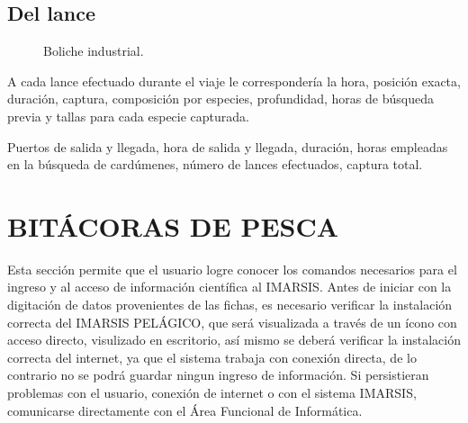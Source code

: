 \documentclass[a4paper,oneside,11pt]{book}
\begin{document}
\section{Del lance}
 \begin{figure}[!h]
  \begin{center} 
  \caption{Boliche industrial.}
 \end{center}
  \end{figure}

A cada lance efectuado durante el viaje le correspondería la hora, posición exacta, duración, captura, composición por especies, profundidad, horas de búsqueda previa y tallas para cada especie capturada.

Puertos de salida y llegada, hora de salida y llegada, duración,
horas empleadas en la búsqueda de cardúmenes, número de lances
efectuados, captura total.


\chapter{BITÁCORAS DE PESCA} 
Esta sección permite que el usuario logre conocer los comandos necesarios para el ingreso y al acceso de información científica al IMARSIS. Antes de iniciar con la digitación de datos provenientes de las fichas, es necesario verificar la instalación correcta del IMARSIS PELÁGICO, que será visualizada a través de un ícono con acceso directo, visulizado en escritorio, así mismo se deberá verificar la instalación correcta del internet, ya que el sistema trabaja con conexión directa, de lo contrario no se podrá guardar ningun ingreso de información.
Si persistieran problemas con el usuario, conexión de internet o  con el sistema IMARSIS, comunicarse directamente con el Área Funcional de Informática. 
\end{document}
